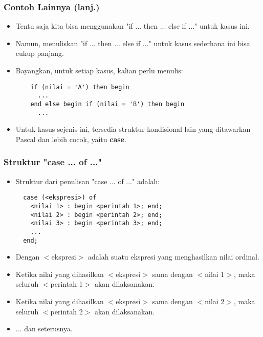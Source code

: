 \documentclass{beamer}
\begin{document}
\begin{frame}[fragile]
\frametitle{Contoh Lainnya (lanj.)}
\begin{itemize}
  \item Tentu saja kita bisa menggunakan "if ... then ... else if ..." untuk kasus ini.
  \item Namun, menuliskan "if ... then ... else if ..." untuk kasus sederhana ini bisa cukup panjang.
  \item Bayangkan, untuk setiap kasus, kalian perlu menulis:
  \begin{lstlisting}
    if (nilai = 'A') then begin
      ...
    end else begin if (nilai = 'B') then begin
      ...
  \end{lstlisting}
  \item Untuk kasus sejenis ini, tersedia struktur kondisional lain yang ditawarkan Pascal dan lebih cocok, yaitu \alert{\textbf{case}}.
\end{itemize}
\end{frame}

\begin{frame}[fragile]
\frametitle{Struktur "case ... of ..."}
\begin{itemize}
  \item Struktur dari penulisan "case ... of ..." adalah:
  \begin{lstlisting}
  case (<ekspresi>) of
    <nilai 1> : begin <perintah 1>; end;
    <nilai 2> : begin <perintah 2>; end;
    <nilai 3> : begin <perintah 3>; end;
    ...
  end;
  \end{lstlisting}

  \item Dengan $<$ekspresi$>$ adalah suatu ekspresi yang menghasilkan \alert{nilai ordinal}.
  \item Ketika nilai yang dihasilkan $<$ekspresi$>$ sama dengan $<$nilai 1$>$, maka seluruh $<$perintah 1$>$ akan dilaksanakan.
  \item Ketika nilai yang dihasilkan $<$ekspresi$>$ sama dengan $<$nilai 2$>$, maka seluruh $<$perintah 2$>$ akan dilaksanakan.
  \item ... dan seterusnya.
\end{itemize}
\end{frame}
\end{document}
